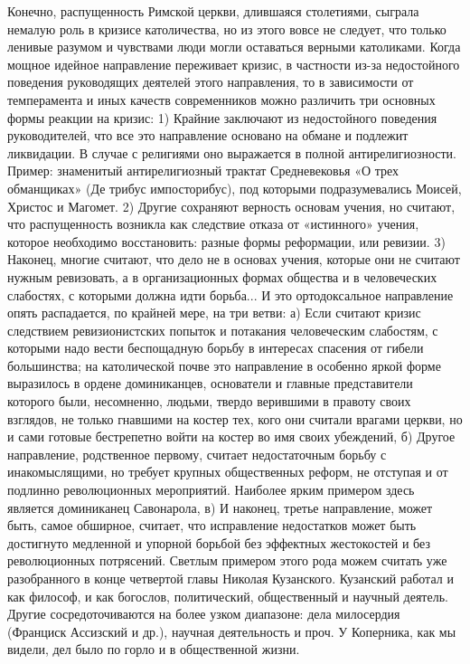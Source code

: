 Конечно, распущенность Римской церкви, длившаяся столетиями, сыграла
немалую роль в кризисе католичества, но из этого вовсе не следует, что
только ленивые разумом и чувствами люди могли оставаться верными
католиками. Когда мощное идейное направление переживает кризис, в
частности из-за недостойного поведения руководящих деятелей этого
направления, то в зависимости от темперамента и иных качеств
современников можно различить три основных формы реакции на кризис: 1)
Крайние заключают из недостойного поведения руководителей, что все это
направление основано на обмане и подлежит ликвидации. В случае с
религиями оно выражается в полной антирелигиозности. Пример:
знаменитый антирелигиозный трактат Средневековья «О трех обманщиках»
(Де трибус импосторибус), под которыми подразумевались Моисей, Христос
и Магомет. 2) Другие сохраняют верность основам учения, но считают,
что распущенность возникла как следствие отказа от «истинного» учения,
которое необходимо восстановить: разные формы реформации, или ревизии.
3) Наконец, многие считают, что дело не в основах учения, которые они
не считают нужным ревизовать, а в организационных формах общества и в
человеческих слабостях, с которыми должна идти борьба... И это
ортодоксальное направление опять распадается, по крайней мере, на три
ветви: а) Если считают кризис следствием ревизионистских попыток и
потакания человеческим слабостям, с которыми надо вести беспощадную
борьбу в интересах спасения от гибели большинства; на католической
почве это направление в особенно яркой форме выразилось в ордене
доминиканцев, основатели и главные представители которого были,
несомненно, людьми, твердо верившими в правоту своих взглядов, не
только гнавшими на костер тех, кого они считали врагами церкви, но и
сами готовые бестрепетно войти на костер во имя своих убеждений, б)
Другое направление, родственное первому, считает недостаточным борьбу
с инакомыслящими, но требует крупных общественных реформ, не отступая
и от подлинно революционных мероприятий. Наиболее ярким примером здесь
является доминиканец Савонарола, в) И наконец, третье направление,
может быть, самое обширное, считает, что исправление недостатков может
быть достигнуто медленной и упорной борьбой без эффектных жестокостей
и без революционных потрясений. Светлым примером этого рода можем
считать уже разобранного в конце четвертой главы Николая Кузанского.
Кузанский работал и как философ, и как богослов, политический,
общественный и научный деятель. Другие сосредоточиваются на более
узком диапазоне: дела милосердия (Франциск Ассизский и др.), научная
деятельность и проч. У Коперника, как мы видели, дел было по горло и в
общественной жизни.

